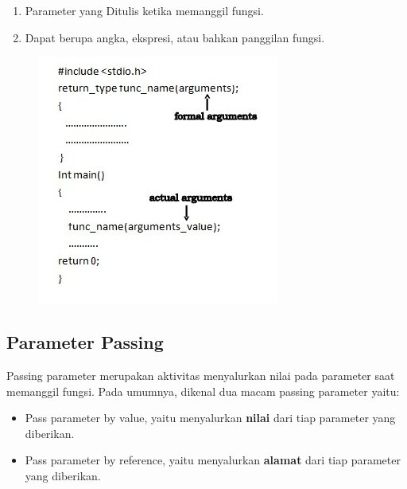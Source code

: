 \begin{enumerate}
\begin{enumerate}
              \item Parameter yang Ditulis ketika memanggil fungsi.
              \item Dapat berupa angka, ekspresi, atau bahkan panggilan fungsi.
          \end{enumerate}
          \begin{figure}[H]
              \centering
              \includegraphics[width=0.5\linewidth]{P3/img/screenshot006.png}
              \caption{}
              \label{fig:parameterformalaktual}
          \end{figure}
\end{enumerate}
\subsection{Parameter Passing}
Passing parameter merupakan aktivitas menyalurkan nilai pada parameter saat memanggil fungsi. Pada umumnya, dikenal dua macam passing parameter yaitu:
\begin{itemize}
    \item Pass parameter by value, yaitu menyalurkan \textbf{nilai} dari tiap parameter yang diberikan.
    \item Pass parameter by reference, yaitu menyalurkan \textbf{alamat} dari tiap parameter yang diberikan.
\end{itemize}

